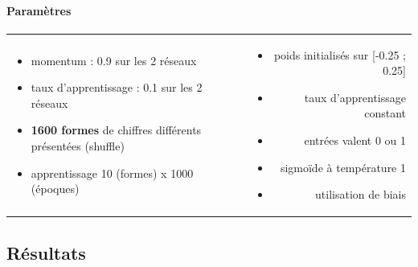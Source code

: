     \paragraph{Paramètres}
      \begin{center}
	\begin{tabular}{lr}
	  \begin{minipage}{230px}
	    \begin{itemize}
	      \item momentum : 0.9 sur les 2 réseaux
	      \item taux d'apprentissage : 0.1 sur les 2 réseaux
	      \item \textbf{1600 formes} de chiffres différents présentées (shuffle) \cite{Handwritten_256}
	      \item apprentissage 10 (formes) x 1000 (époques)
	    \end{itemize}
	  \end{minipage}
	  &
	  \begin{minipage}{230px}
	    \begin{itemize}
	      \item poids initialisés sur [-0.25 ; 0.25]
	      \item taux d'apprentissage constant
	      \item entrées valent 0 ou 1
	      \item sigmoïde à température 1
	      \item utilisation de biais
	    \end{itemize}
	  \end{minipage}
	\end{tabular}
      \end{center}

  
  \newpage
  \subsection{Résultats}
